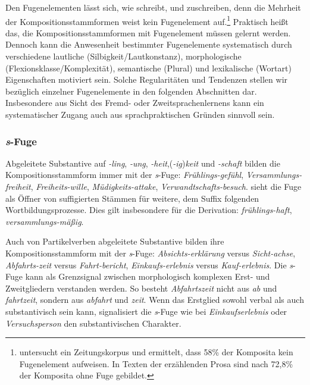 Den Fugenelementen lässt sich, wie \citet[525, 532]{Fuhrhop1996} schreibt,  und  zuschreiben, denn die Mehrheit der Kompositionsstammformen weist kein Fugenelement auf.\footnote{\citet[105]{Kuerschner2003} untersucht ein Zeitungskorpus und ermittelt, dass 58\% der Komposita kein Fugenelement aufweisen. In Texten der erzählenden Prosa sind nach \citet[54]{Ortner_Komposita1991} 72,8\% der Komposita ohne Fuge gebildet.} Praktisch heißt das, die Kompositionsstammformen mit Fugenelement müssen gelernt werden. Dennoch kann die Anwesenheit bestimmter Fugenelemente systematisch durch verschiedene lautliche (Silbigkeit/Lautkonstanz), morphologische (Flexionsklasse/Komplexität), semantische (Plural) und lexikalische (Wortart) Eigenschaften motiviert sein. Solche Regularitäten und Tendenzen stellen wir bezüglich einzelner Fugenelemente in den folgenden Abschnitten dar. Insbesondere aus Sicht des Fremd- oder Zweitsprachenlernens kann ein systematischer Zugang auch aus sprachpraktischen Gründen sinnvoll sein.


\subsubsection{\textit{s}-Fuge}\label{subsubsection:s-Fuge}

Abgeleitete Substantive auf \textit{-ling}, \textit{-ung}, \textit{-heit},(\textit{-ig})\textit{keit} und \textit{-schaft} bilden die Kompositionsstammform immer mit der \textit{s}-Fuge: \textit{Frühlings-gefühl}, \textit{Versammlungs-freiheit}, \textit{Freiheits-wille}, \textit{Müdigkeits-attake}, \textit{Verwandtschafts-besuch}. \citet[210--211]{Fuhrhop2000} sieht die Fuge als Öffner von suffigierten Stämmen für weitere, dem Suffix folgenden Wortbildungsprozesse. Dies gilt insbesondere für die Derivation: \textit{frühlings-haft}, \textit{versammlungs-mäßig}. 

Auch von Partikelverben abgeleitete Substantive bilden ihre Kompositionsstammform mit der \textit{s}-Fuge: \textit{Absichts-erklärung} versus \textit{Sicht-achse}, \textit{Abfahrts-zeit} versus \textit{Fahrt-bericht}, \textit{Einkaufs-erlebnis} versus \textit{Kauf-erlebnis}. Die \textit{s}-Fuge kann als Grenzsignal zwischen morphologisch komplexen Erst- und Zweitgliedern verstanden werden. So besteht \textit{Abfahrtszeit} nicht aus \textit{ab} und \textit{fahrtzeit}, sondern aus \textit{abfahrt} und \textit{zeit}. Wenn das Erstglied sowohl verbal als auch substantivisch sein kann, signalisiert die \textit{s}-Fuge wie bei \textit{Einkaufserlebnis} oder \textit{Versuchsperson} den substantivischen Charakter. 

